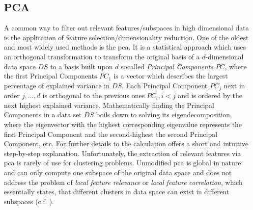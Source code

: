\subsection{PCA}
A common way to filter out relevant features/subspaces in high dimensional data is the application of feature selection/dimensionality reduction. One of the oldest and most widely used methods is the \gls{pca}. It is a statistical approach which uses an orthogonal transformation to transform the original basis of a $d$-dimensional data space $DS$ to a basis built upon $d$ socalled \textit{Principal Components} $PC$, where the first Principal Components $PC_1$ is a vector which describes the largest percentage of explained variance in $DS$. Each Principal Component $PC_j$ next in order $j,\dotsc,d$ is orthogonal to the previous ones $PC_i, i<j$ and is ordered by the next highest explained variance. Mathematically finding the Principal Components in a data set $DS$ boils down to solving its eigendecomposition, where the eigenvector with the highest corresponding eigenvalue represents the first Principal Component and the second-highest the second Principal Component, etc\cite{pcawold1987principal}. For further details to the calculation \textcite{pcamljolliffe1986principal} offers a short and intuitive step-by-step explanation.
Unfortunately, the extraction of relevant features via \gls{pca} is rarely of use for clustering problems. Unmodified \gls{pca} is global in nature and can only compute one subspace of the original data space and does not address the problem of \textit{local feature relevance} or \textit{local feature correlation}, which essentially states, that different clusters in data space can exist in different subspaces\cite{kriegel2009clustering} (c.f. \cite{PCAshlens2014tutorial}). 


